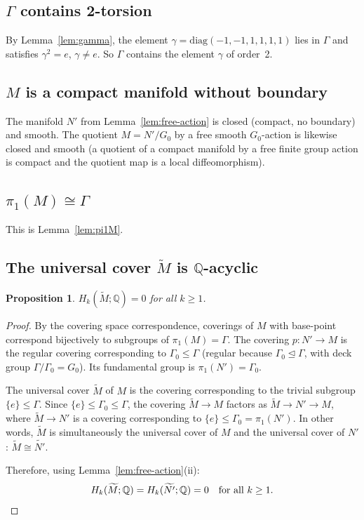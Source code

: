 \documentclass[12pt]{article}
\newtheorem{proposition}[theorem]{Proposition}
\theoremstyle{definition}
\theoremstyle{remark}
\begin{document}
\subsection{$\Gamma$ contains 2-torsion}
\label{sub:verif-torsion}

By Lemma~\ref{lem:gamma}, the element $\gamma = \mathrm{diag}(-1,-1,1,1,1,1)$ lies in
$\Gamma$ and satisfies $\gamma^2 = e$, $\gamma \neq e$. So $\Gamma$ contains the
element $\gamma$ of order~2. \checkmark

\subsection{$M$ is a compact manifold without boundary}
\label{sub:verif-manifold}

The manifold $N'$ from Lemma~\ref{lem:free-action} is closed (compact, no boundary)
and smooth. The quotient $M = N'/G_0$ by a free smooth $G_0$-action is likewise closed
and smooth (a quotient of a compact manifold by a free finite group action is compact
and the quotient map is a local diffeomorphism). \checkmark

\subsection{$\pi_1(M) \cong \Gamma$}
\label{sub:verif-pi1}

This is Lemma~\ref{lem:pi1M}. \checkmark

\subsection{The universal cover $\widetilde{M}$ is $\mathbb{Q}$-acyclic}
\label{sub:verif-acyclic}

\begin{proposition}
\label{prop:acyclic}
$H_k(\widetilde{M};\mathbb{Q}) = 0$ for all $k \geq 1$.
\end{proposition}

\begin{proof}
By the covering space correspondence, coverings of $M$ with base-point correspond
bijectively to subgroups of $\pi_1(M) = \Gamma$. The covering $p: N' \to M$ is the
regular covering corresponding to $\Gamma_0 \leq \Gamma$ (regular because
$\Gamma_0 \unlhd \Gamma$, with deck group $\Gamma/\Gamma_0 = G_0$). Its fundamental
group is $\pi_1(N') = \Gamma_0$.

The universal cover $\widetilde{M}$ of $M$ is the covering corresponding to the trivial
subgroup $\{e\} \leq \Gamma$. Since $\{e\} \leq \Gamma_0 \leq \Gamma$, the covering
$\widetilde{M} \to M$ factors as $\widetilde{M} \to N' \to M$, where
$\widetilde{M} \to N'$ is a covering corresponding to $\{e\} \leq \Gamma_0 = \pi_1(N')$.
In other words, $\widetilde{M}$ is simultaneously the universal cover of $M$ and the
universal cover of $N'$: $\widetilde{M} \cong \widetilde{N'}$.

Therefore, using Lemma~\ref{lem:free-action}(ii):
\[
  H_k(\widetilde{M};\mathbb{Q}) = H_k(\widetilde{N'};\mathbb{Q}) = 0
  \quad \text{for all } k \geq 1. \qedhere
\]
\end{proof}
\end{document}
